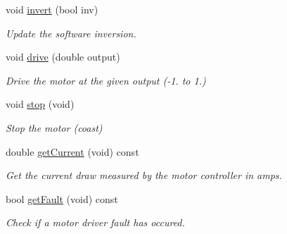 \begin{DoxyCompactItemize}
\item 
void \hyperlink{class_pololu_motor_a775d61d3b864ba6ffd4fb9195ccb26b3}{invert} (bool inv)
\begin{DoxyCompactList}\small\item\em Update the software inversion. \end{DoxyCompactList}\item 
void \hyperlink{class_pololu_motor_abcece838332aaf501b6ae63fa371422e}{drive} (double output)
\begin{DoxyCompactList}\small\item\em Drive the motor at the given output (-\/1. to 1.) \end{DoxyCompactList}\item 
void \hyperlink{class_pololu_motor_a57c4465fe5791b4a57c42fcca3579ea4}{stop} (void)
\begin{DoxyCompactList}\small\item\em Stop the motor (coast) \end{DoxyCompactList}\item 
double \hyperlink{class_pololu_motor_aa839e55cf769cbdec066e82f148fbd1d}{get\+Current} (void) const
\begin{DoxyCompactList}\small\item\em Get the current draw measured by the motor controller in amps. \end{DoxyCompactList}\item 
bool \hyperlink{class_pololu_motor_a677969e5e4b72a502508e9a152059064}{get\+Fault} (void) const
\begin{DoxyCompactList}\small\item\em Check if a motor driver fault has occured. \end{DoxyCompactList}\end{DoxyCompactItemize}
